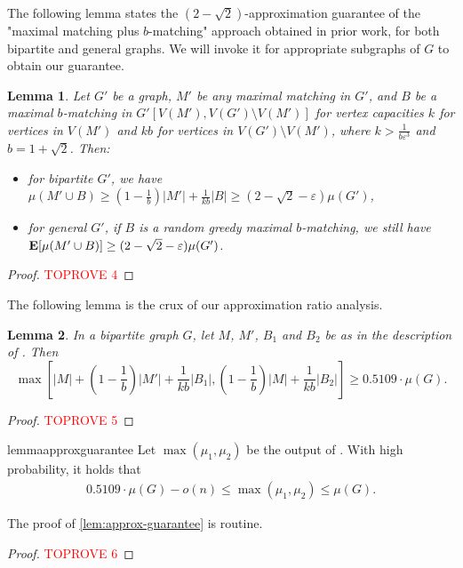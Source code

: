 \documentclass[letterpaper,11pt]{article}
\renewcommand{\epsilon}{\varepsilon}
\DeclareMathOperator{\E}{\ensuremath{\normalfont \textbf{E}}}
\newtheorem{lemma}{Lemma}[section]
\begin{document}
\newcommand{\mo}{\ensuremath{|M_1^*|}}
\newcommand{\mop}{\ensuremath{|M_1^{'*}|}}
\newcommand{\mt}{\ensuremath{|M_2^{*}|}}
\newcommand{\mtp}{\ensuremath{|M_2^{'*}|}}
\newcommand{\mtpp}{\ensuremath{|M_2^{''*}|}}

The following lemma states the $(2-\sqrt{2})$-approximation guarantee
of the "maximal matching plus $b$-matching" approach
obtained in prior work,
for both bipartite and general graphs.
We will invoke it for appropriate subgraphs of $G$
to obtain our guarantee.

\begin{lemma}
    \label{lem:585}
    Let $G'$ be a graph,
    $M'$ be any maximal matching in $G'$,
    and $B$ be a maximal $b$-matching in $G'[V(M'), V(G') \setminus V(M')]$
    for vertex capacities $k$ for vertices in $V(M')$
    and $kb$ for vertices in $V(G') \setminus V(M')$,
    where $k > \frac{1}{b \epsilon^3}$
    and $b = 1 + \sqrt{2}$.
    Then:
    \begin{itemize}
        \item for bipartite $G'$, we have $\mu(M' \cup B) \ge (1-\frac{1}{b})|M'|+\frac{1}{kb}|B| \ge (2-\sqrt{2}-\epsilon)\mu(G')$,
        \item 
        for general $G'$, if $B$ is a \emph{random greedy} maximal $b$-matching,
        we still have $\E[\mu(M' \cup B)] \ge (2-\sqrt{2}-\epsilon)\mu(G')$.
    \end{itemize}
\end{lemma}
\begin{proof}\textcolor{red}{TOPROVE 4}\end{proof}

The following lemma is the crux of our approximation ratio analysis.

\begin{lemma} \label{lem:apx051bipartite}
    In a bipartite graph $G$,
    let $M$, $M'$, $B_1$ and $B_2$ be as in the description of . Then
    \[\max \left[|M| + (1 - \frac{1}{b}) |M'| + \frac{1}{kb} |B_1|, (1 - \frac{1}{b}) |M| + \frac{1}{kb} |B_2| \right] \geq 0.5109  \cdot\mu(G) .\]
\end{lemma}
\begin{proof}\textcolor{red}{TOPROVE 5}\end{proof}



\begin{restatable}{lemma}{approxguarantee}
\label{lem:approx-guarantee}
    Let $\max(\mu_1, \mu_2)$ be the output of . With high probability, it holds that
    \begin{align*}
        0.5109\cdot \mu(G) - o(n) \leq \max(\mu_1, \mu_2) \leq \mu(G).
    \end{align*}
\end{restatable}
The proof of \cref{lem:approx-guarantee} is routine.
\begin{proof}\textcolor{red}{TOPROVE 6}\end{proof}
\end{document}
